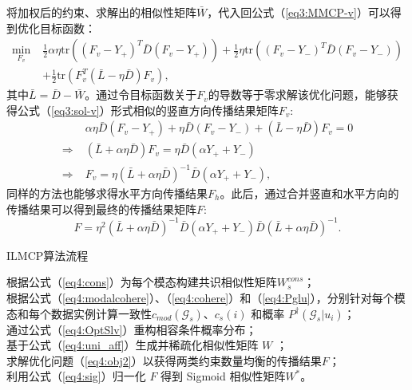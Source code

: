 将加权后的约束、求解出的相似性矩阵$\bar{W}$，代入回公式（\ref{eq3:MMCP-v}）可以得到优化目标函数：
\begin{equation}
\begin{split}
\mathop{\mathrm{min}}_{{F}_v}\;&\frac{1}{2}\alpha\eta \mathrm{tr}(({F}_v-{Y}_+)^T{\bar{D}}({F}_v-{Y}_+))+\frac{1}{2}\eta \mathrm{tr}(({F}_v-{Y}_-)^T{\bar{D}}({F}_v-{Y}_-))\\
&+\frac{1}{2}\mathrm{tr}({F}_v^T(\bar{L}-\eta {\bar{D}}){F}_v), 
\end{split}
\label{eq4:obj2}
\end{equation}
其中$\bar{L} = \bar{D} - \bar{W}$。通过令目标函数关于$F_v$的导数等于零求解该优化问题，能够获得公式（\ref{eq3:sol-v}）形式相似的竖直方向传播结果矩阵$F_v$:
\begin{equation}
\begin{split}
        & \alpha\eta \bar{D} (F_v - Y_+) + \eta\bar{D} (F_v - Y_-)+(\bar{L}-\eta\bar{D})F_v = 0\\
\Rightarrow   \;          & (\bar{L}+\alpha\eta\bar{D})F_v = \eta\bar{D}(\alpha Y_++Y_-)\\
\Rightarrow   \;          & {F}_v = \eta(\bar{L}+\alpha\eta{\bar{D}})^{-1}{\bar{D}}(\alpha {Y}_++{Y}_-),
\end{split}
\end{equation}
同样的方法也能够求得水平方向传播结果$F_h$。此后，通过合并竖直和水平方向的传播结果可以得到最终的传播结果矩阵$F$:
\begin{equation}
{ F} = \eta^2(\bar{L}+\alpha\eta{\bar{D}})^{-1}{\bar{D}}(\alpha {Y}_++{Y}_-){\bar{D}}(\bar{L}+\alpha\eta{\bar{D}})^{-1}.
\end{equation}


\begin{algorithm}[tb]
    \caption{ILMCP算法流程}
    \label{alg4:ilmcp}
    根据公式（\ref{eq4:cons}）为每个模态构建共识相似性矩阵$ {W} ^{cons}_s$；\\
    根据公式（\ref{eq4:modalcohere}）、（\ref{eq4:cohere}）和（\ref{eq4:Pglu}），分别针对每个模态和每个数据实例计算一致性$ c_{mod}(\mathcal{G}_s)$、$c_s(i) $ 和概率 $ P^\dagger (\mathcal{G}_s|u_i) $；\\
    通过公式（\ref{eq4:OptSlv}）重构相容条件概率分布；\\
    基于公式（\ref{eq4:uni_aff}）生成并稀疏化相似性矩阵 $ {W} $ ；\\
    求解优化问题（\ref{eq4:obj2}）以获得两类约束数量均衡的传播结果$ {F} $；\\
    利用公式（\ref{eq4:sig}）归一化 $ {F} $ 得到 Sigmoid 相似性矩阵$ {W^*}$。
\end{algorithm}

